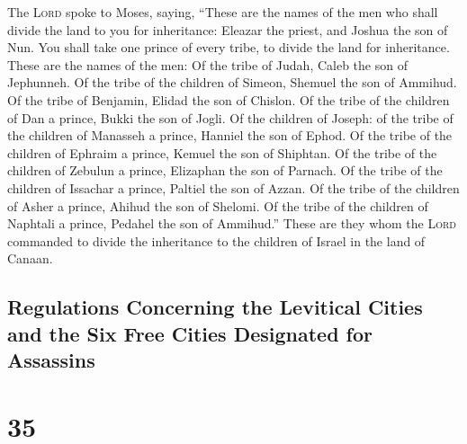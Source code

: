  The \textsc{Lord} spoke to Moses, saying,
 ``These are the names of the men who shall divide the
land to you for inheritance: Eleazar the priest, and Joshua the son of
Nun.  You shall take one prince of every tribe, to divide
the land for inheritance.  These are the names of the
men: Of the tribe of Judah, Caleb the son of Jephunneh. 
Of the tribe of the children of Simeon, Shemuel the son of Ammihud.
 Of the tribe of Benjamin, Elidad the son of Chislon.
 Of the tribe of the children of Dan a prince, Bukki the
son of Jogli.  Of the children of Joseph: of the tribe of
the children of Manasseh a prince, Hanniel the son of Ephod.
 Of the tribe of the children of Ephraim a prince, Kemuel
the son of Shiphtan.  Of the tribe of the children of
Zebulun a prince, Elizaphan the son of Parnach.  Of the
tribe of the children of Issachar a prince, Paltiel the son of Azzan.
 Of the tribe of the children of Asher a prince, Ahihud
the son of Shelomi.  Of the tribe of the children of
Naphtali a prince, Pedahel the son of Ammihud.''  These
are they whom the \textsc{Lord} commanded to divide the inheritance to
the children of Israel in the land of Canaan.

\hypertarget{regulations-concerning-the-levitical-cities-and-the-six-free-cities-designated-for-assassins}{%
\subsection{Regulations Concerning the Levitical Cities and the Six Free
Cities Designated for
Assassins}\label{regulations-concerning-the-levitical-cities-and-the-six-free-cities-designated-for-assassins}}

\hypertarget{section-34}{%
\section{35}\label{section-34}}

